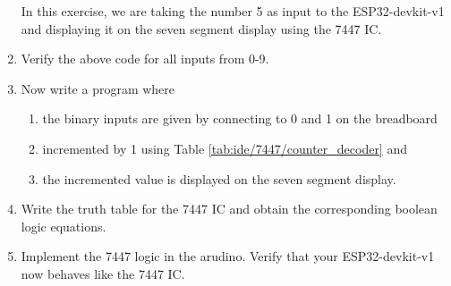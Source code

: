 \begin{enumerate}[label=\arabic*.,ref=\theenumi]
\solution
In this exercise, we are taking the number 5 as input to the ESP32-devkit-v1 and displaying it on the seven segment display using the 7447 IC.
\begin{table}[H]
\centering

\caption{}
\label{table:ip_7447_ard}
\end{table}
\item
Verify the above code for all inputs from 0-9.

\item
Now write a program where 
\begin{enumerate}
\item the binary inputs are given by
connecting to 0 and 1 on the breadboard
\item incremented by 1 using Table \ref{tab:ide/7447/counter_decoder} and
\item the incremented value is displayed on the seven segment display.
\end{enumerate}

\item
Write the truth table for the 7447 IC and obtain the corresponding boolean logic equations. 

\item
Implement the 7447 logic in the arudino.  Verify that your ESP32-devkit-v1 now behaves like the 7447 IC.
	\end{enumerate}

